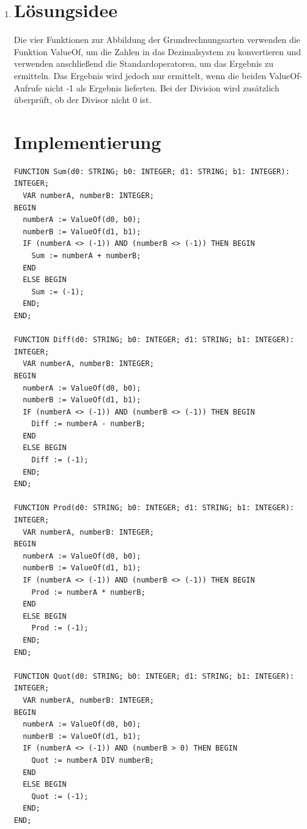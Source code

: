 \documentclass[a4paper]{article}
\begin{document}
\begin{enumerate}
\begin{enumerate}
			\item
			\section*{Lösungsidee}
			Die vier Funktionen zur Abbildung der Grundrechnungsarten verwenden die Funktion ValueOf, um die Zahlen in das Dezimalsystem zu konvertieren und verwenden anschließend die Standardoperatoren, um das Ergebnis zu ermitteln. Das Ergebnis wird jedoch nur ermittelt, wenn die beiden ValueOf-Aufrufe nicht -1 als Ergebnis lieferten. Bei der Division wird zusätzlich überprüft, ob der Divisor nicht 0 ist.
			
			\section*{Implementierung}
			\begin{lstlisting}[label=scCalculation, resetmargins=true]
FUNCTION Sum(d0: STRING; b0: INTEGER; d1: STRING; b1: INTEGER): INTEGER;
  VAR numberA, numberB: INTEGER;
BEGIN
  numberA := ValueOf(d0, b0);
  numberB := ValueOf(d1, b1);
  IF (numberA <> (-1)) AND (numberB <> (-1)) THEN BEGIN
    Sum := numberA + numberB;
  END
  ELSE BEGIN
    Sum := (-1);
  END;
END;

FUNCTION Diff(d0: STRING; b0: INTEGER; d1: STRING; b1: INTEGER): INTEGER;
  VAR numberA, numberB: INTEGER;
BEGIN
  numberA := ValueOf(d0, b0);
  numberB := ValueOf(d1, b1);
  IF (numberA <> (-1)) AND (numberB <> (-1)) THEN BEGIN
    Diff := numberA - numberB;
  END
  ELSE BEGIN
    Diff := (-1);
  END;
END;

FUNCTION Prod(d0: STRING; b0: INTEGER; d1: STRING; b1: INTEGER): INTEGER;
  VAR numberA, numberB: INTEGER;
BEGIN
  numberA := ValueOf(d0, b0);
  numberB := ValueOf(d1, b1);
  IF (numberA <> (-1)) AND (numberB <> (-1)) THEN BEGIN
    Prod := numberA * numberB;
  END
  ELSE BEGIN
    Prod := (-1);
  END;
END;

FUNCTION Quot(d0: STRING; b0: INTEGER; d1: STRING; b1: INTEGER): INTEGER;
  VAR numberA, numberB: INTEGER;
BEGIN
  numberA := ValueOf(d0, b0);
  numberB := ValueOf(d1, b1);
  IF (numberA <> (-1)) AND (numberB > 0) THEN BEGIN
    Quot := numberA DIV numberB;
  END
  ELSE BEGIN
    Quot := (-1);
  END;
END;
			\end{lstlisting}
			

\end{enumerate}
\end{enumerate}
\end{document}

